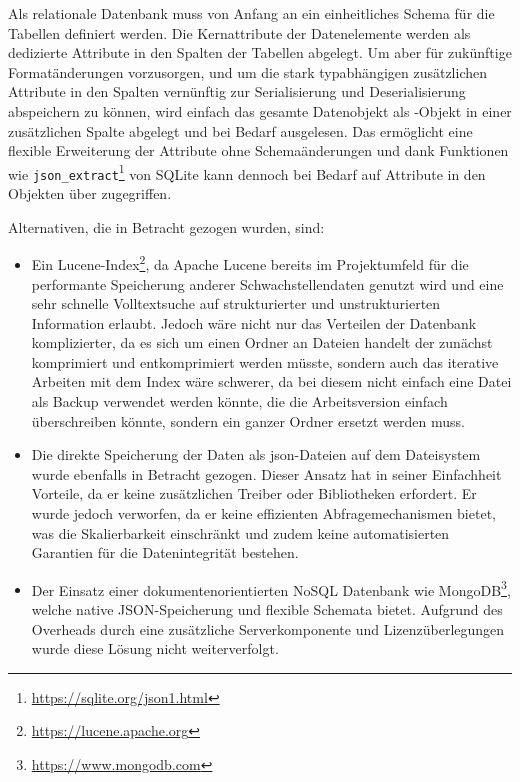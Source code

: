 Als relationale Datenbank muss von Anfang an ein einheitliches Schema für die Tabellen definiert werden.
Die Kernattribute der Datenelemente werden als dedizierte Attribute in den Spalten der Tabellen abgelegt.
Um aber für zukünftige Formatänderungen vorzusorgen, und um die stark typabhängigen zusätzlichen Attribute in den Spalten vernünftig zur Serialisierung und Deserialisierung abspeichern zu können, wird einfach das gesamte Datenobjekt als -Objekt in einer zusätzlichen Spalte abgelegt und bei Bedarf ausgelesen.
Das ermöglicht eine flexible Erweiterung der Attribute ohne Schemaänderungen und dank Funktionen wie \texttt{json\_extract}\footnote{\url{https://sqlite.org/json1.html}} von SQLite kann dennoch bei Bedarf auf Attribute in den Objekten über  zugegriffen.

Alternativen, die in Betracht gezogen wurden, sind:

\begin{itemize}
    \itemsep0em
    \item Ein Lucene-Index\footnote{\url{https://lucene.apache.org}}, da Apache Lucene bereits im Projektumfeld für die performante Speicherung anderer Schwachstellendaten genutzt wird und eine sehr schnelle Volltextsuche auf strukturierter und unstrukturierten Information erlaubt.
    Jedoch wäre nicht nur das Verteilen der Datenbank komplizierter, da es sich um einen Ordner an Dateien handelt der zunächst komprimiert und entkomprimiert werden müsste, sondern auch das iterative Arbeiten mit dem Index wäre schwerer, da bei diesem nicht einfach eine Datei als Backup verwendet werden könnte, die die Arbeitsversion einfach überschreiben könnte, sondern ein ganzer Ordner ersetzt werden muss.
    \item Die direkte Speicherung der Daten als \acrshort{json}-Dateien auf dem Dateisystem wurde ebenfalls in Betracht gezogen.
    Dieser Ansatz hat in seiner Einfachheit Vorteile, da er keine zusätzlichen Treiber oder Bibliotheken erfordert.
    Er wurde jedoch verworfen, da er keine effizienten Abfragemechanismen bietet, was die Skalierbarkeit einschränkt und zudem keine automatisierten Garantien für die Datenintegrität bestehen.
    \item Der Einsatz einer dokumentenorientierten NoSQL Datenbank wie MongoDB\footnote{\url{https://www.mongodb.com}}, welche native JSON-Speicherung und flexible Schemata bietet.
    Aufgrund des Overheads durch eine zusätzliche Serverkomponente und Lizenzüberlegungen wurde diese Lösung nicht weiterverfolgt.
\end{itemize}

